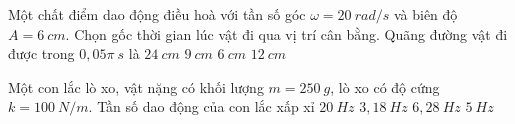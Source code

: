 	\begin{ex}%
		Một chất điểm dao động điều hoà với tần số góc $\omega=20\ rad/s$ và biên độ $A = 6\ cm$. Chọn gốc thời gian lúc vật đi qua vị trí cân bằng. Quãng đường vật đi được trong $0,05\pi\ s$ là
		\choice
		{$24\ cm$}
		{$9\ cm$}
		{$6\ cm$}
		{\True $12\ cm$}
	\end{ex}
	\begin{ex}%
		Một con lắc lò xo, vật nặng có khối lượng $m = 250\ g$, lò xo có độ cứng $k = 100\ N/m$. Tần số dao động của con lắc xấp xỉ
		\choice
		{$20\ Hz$}
		{\True $3,18\ Hz$}
		{$6,28\ Hz$}
		{$5\ Hz$}
	\end{ex}
